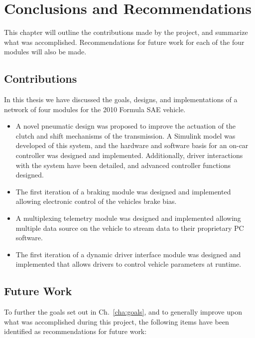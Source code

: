 
\chapter{Conclusions and Recommendations}

This chapter will outline the contributions made by the project, and summarize what was accomplished. Recommendations for future work for each of the four modules will also be made.

\section{Contributions}

In this thesis we have discussed the goals, designs, and implementations of a network of four modules for the 2010 Formula SAE vehicle.

\begin{itemize}
  \item A novel pneumatic design was proposed to improve the actuation of the clutch and shift mechanisms of the transmission. A Simulink model was developed of this system, and the hardware and software basis for an on-car controller was designed and implemented. Additionally, driver interactions with the system have been detailed, and advanced controller functions designed.

  \item The first iteration of a braking module was designed and implemented allowing electronic control of the vehicles brake bias.

  \item A multiplexing telemetry module was designed and implemented allowing multiple data source on the vehicle to stream data to their proprietary PC software.

  \item The first iteration of a dynamic driver interface module was designed and implemented that allows drivers to control vehicle parameters at runtime.
\end{itemize}

\section{Future Work}

To further the goals set out in Ch.\ \ref{cha:goals}, and to generally improve upon what was accomplished during this project, the following items have been identified as recommendations for future work:

